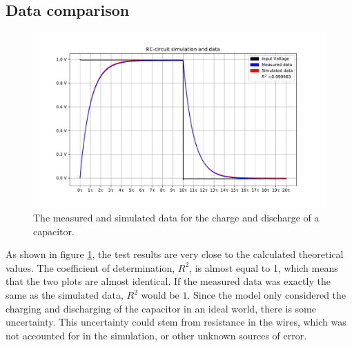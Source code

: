 \subsection{Data comparison}
\begin{figure}[H]
\center
\includegraphics[scale=0.6]{fig/img/eks_1}
\caption{The measured and simulated data for the charge and discharge of a capacitor.}
\label{fig:Cap}
\end{figure}
\noindent
As shown in figure \ref{fig:Cap}, the test results are very close to the calculated theoretical values. The coefficient of determination, $R^2$, is almost equal to 1, which means that the two plots are almost identical. If the measured data was exactly the same as the simulated data, $R^2$ would be $1$. Since the model only considered the charging and discharging of the capacitor in an ideal world, there is some uncertainty. This uncertainty could stem from resistance in the wires, which was not accounted for in the simulation, or other unknown sources of error.